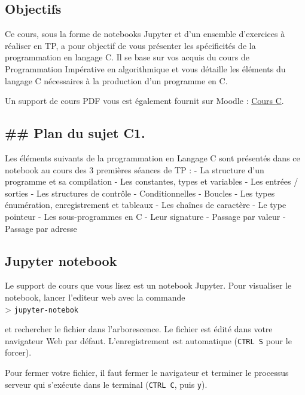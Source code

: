 \documentclass[11pt]{article}
\begin{document}
    \hypertarget{objectifs}{%
\subsection{Objectifs}\label{objectifs}}

Ce cours, sous la forme de notebooks Jupyter et d'un ensemble
d'exercices à réaliser en TP, a pour objectif de vous présenter les
spécificités de la programmation en langage C. Il se base sur vos acquis
du cours de Programmation Impérative en algorithmique et vous détaille
les éléments du langage C nécessaires à la production d'un programme en
C.

Un support de cours PDF vous est également fournit sur Moodle :
\href{http://moodle-n7.inp-toulouse.fr/pluginfile.php/49240/mod_resource/content/5/LangageC_poly.pdf}{Cours
C}.

    \hypertarget{plan-du-sujet-c1.}{%
\subsection{\#\# Plan du sujet C1.}\label{plan-du-sujet-c1.}}

Les éléments suivants de la programmation en Langage C sont présentés
dans ce notebook au cours des 3 premières séances de TP : - La structure
d'un programme et sa compilation - Les constantes, types et variables -
Les entrées / sorties - Les structures de contrôle - Conditionnelles -
Boucles - Les types énumération, enregistrement et tableaux - Les
chaînes de caractère - Le type pointeur - Les sous-programmes en C -
Leur signature - Passage par valeur - Passage par adresse

    \hypertarget{jupyter-notebook}{%
\subsection{Jupyter notebook}\label{jupyter-notebook}}

Le support de cours que vous lisez est un notebook Jupyter. Pour
visualiser le notebook, lancer l'editeur web avec la commande\\
\textgreater{} \texttt{jupyter-notebok}

et rechercher le fichier dans l'arborescence. Le fichier est édité dans
votre navigateur Web par défaut. L'enregistrement est automatique
(\texttt{CTRL\ S} pour le forcer).

Pour fermer votre fichier, il faut fermer le navigateur et terminer le
processus serveur qui s'exécute dans le terminal (\texttt{CTRL\ C}, puis
\texttt{y}).
\end{document}
